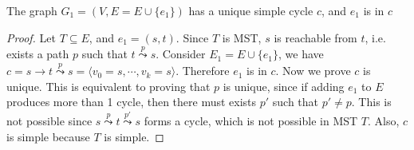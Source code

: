 \documentclass[11pt]{article}
\begin{document}
\begin{enumerate}
\begin{solution}
        \begin{algorithm}[H]


        \end{algorithm}

        \begin{lemma*}
            The graph $G_1 =(V, E = E\cup \{ e_1\})$ has a unique simple cycle $c$, and $e_1$ is in $c$
            \begin{proof}
                Let $T \subseteq E$, and $e_1 = (s,t)$. Since $T$ is MST, $s$ is reachable from $t$, i.e. exists a path $p$ such that $t \overset{p}{\leadsto} s$. Consider $E_1 = E \cup \{ e_1\}$, we have $c = s\to t \overset{p}{\leadsto} s = \langle v_0 = s, \cdots, v_k = s \rangle$. Therefore $e_1$ is in $c$. Now we prove $c$ is unique. This is equivalent to proving that $p$ is unique, since if adding $e_1$ to $E$ produces more than 1 cycle, then there must exists $p'$ such that $p' \neq p$. This is not possible since $s \overset{p}{\leadsto} t \overset{p'}{\leadsto} s$ forms a cycle, which is not possible in MST $T$. Also, $c$ is simple because $T$ is simple. 
            \end{proof}
        \end{lemma*}


\end{solution}
\end{enumerate}
\end{document}

